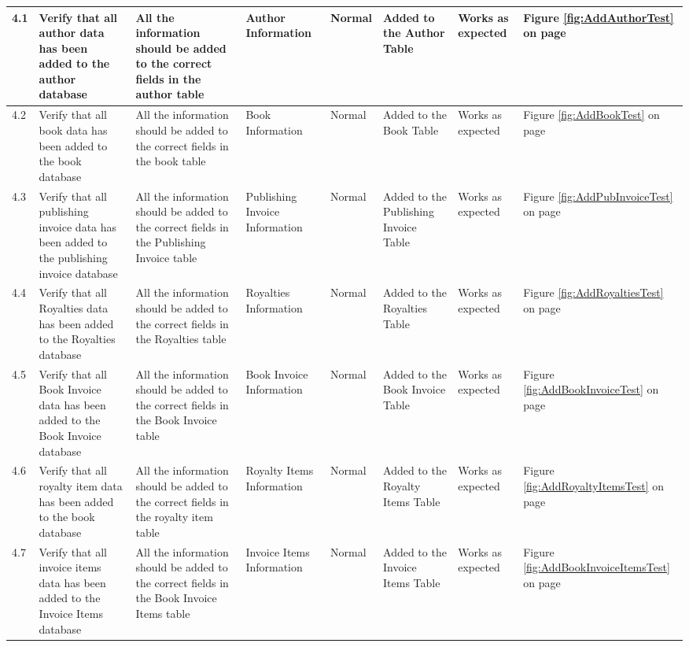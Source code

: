 \begin{landscape}
\begin{center}
\begin{longtable}{|p{1.5cm}|p{2cm}|p{2.5cm}|p{2.5cm}|p{2cm}|p{2cm}|p{2cm}|p{2cm}|}
        4.1 & Verify that all author data has been added to the author database & All the information should be added to the correct fields in the author table & Author Information & Normal & Added to the Author Table & Works as expected & Figure \ref{fig:AddAuthorTest} on page \pageref{fig:AddAuthorTest} \\ \hline 
        4.2 & Verify that all book data has been added to the book database & All the information should be added to the correct fields in the book table & Book Information & Normal & Added to the Book Table & Works as expected & Figure \ref{fig:AddBookTest} on page \pageref{fig:AddBookTest} \\ \hline 
        4.3 & Verify that all publishing invoice data has been added to the publishing invoice database & All the information should be added to the correct fields in the Publishing Invoice table & Publishing Invoice Information & Normal & Added to the Publishing Invoice Table & Works as expected & Figure \ref{fig:AddPubInvoiceTest} on page \pageref{fig:AddPubInvoiceTest} \\ \hline 
        4.4 & Verify that all Royalties data has been added to the Royalties database & All the information should be added to the correct fields in the Royalties table & Royalties Information & Normal & Added to the Royalties Table & Works as expected & Figure \ref{fig:AddRoyaltiesTest} on page \pageref{fig:AddRoyaltiesTest} \\ \hline 
        4.5 & Verify that all Book Invoice data has been added to the Book Invoice database & All the information should be added to the correct fields in the Book Invoice table & Book Invoice Information & Normal & Added to the Book Invoice Table & Works as expected & Figure \ref{fig:AddBookInvoiceTest} on page \pageref{fig:AddBookInvoiceTest} \\ \hline 
        4.6 & Verify that all royalty item data has been added to the book database & All the information should be added to the correct fields in the royalty item table & Royalty Items Information & Normal & Added to the Royalty Items Table & Works as expected & Figure \ref{fig:AddRoyaltyItemsTest} on page \pageref{fig:AddRoyaltyItemsTest} \\ \hline 
        4.7 & Verify that all invoice items data has been added to the Invoice Items database & All the information should be added to the correct fields in the Book Invoice Items table & Invoice Items Information & Normal & Added to the Invoice Items Table & Works as expected & Figure \ref{fig:AddBookInvoiceItemsTest} on page \pageref{fig:AddBookInvoiceItemsTest} \\ \hline 

\end{longtable}
\end{center}
\end{landscape}
